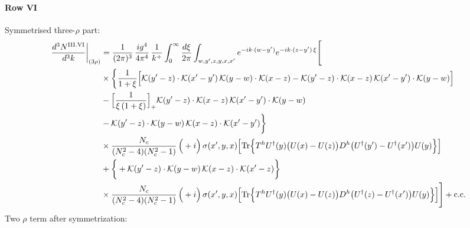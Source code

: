 \documentclass[9pt]{article}
\numberwithin{equation}{section}
\begin{document}
\paragraph*{Row VI}
Symmetrised three-$\rho$ part:
\begin{align}
\frac{d^{3}N^{\rm III.VI}}{d^{3}k}\bigg|_{(3\rho)}&=\frac{1}{(2\pi)^{3}}\,\frac{ig^{4}}{4\pi^{4}}\,\frac{1}{k^{+}}\int_{0}^{\infty}\frac{d\xi}{2\pi}\int_{w,y',z,y,x,x'}e^{-ik\cdot(w-y')}e^{-ik\cdot(z-y')\,\xi}\Bigg[\notag\\
&\times\bigg\{\frac{1}{1+\xi}\Big[\mathcal{K}(y'-z)\cdot\mathcal{K}(x'-y')\,\mathcal{K}(y-w)\cdot\mathcal{K}(x-z)-\mathcal{K}(y'-z)\cdot\mathcal{K}(x-z)\,\mathcal{K}(x'-y')\cdot\mathcal{K}(y-w)\Big]\notag\\
&-\Big[\frac{1}{\xi\,(1+\xi)}\Big]_{+}\mathcal{K}(y'-z)\cdot\mathcal{K}(x-z)\,\mathcal{K}(x'-y')\cdot\mathcal{K}(y-w)\notag\\
&-\mathcal{K}(y'-z)\cdot\mathcal{K}(y-w)\,\mathcal{K}(x-z)\cdot\mathcal{K}(x'-y')\bigg\}\notag\\
&\times \frac{N_{c}}{(N_{c}^{2}-4)(N_{c}^{2}-1)}\,\Big(+i\Big)\,\sigma(x',y,x)\Big[{\rm Tr}\Big\{T^{h}U^{\dagger}(y)\big(U(x)-U(z)\big)D^{h}\big(U^{\dagger}(y')-U^{\dagger}(x')\big)U(y)\Big\}\Big]\notag\\
&+\bigg\{+\mathcal{K}(y'-z)\cdot\mathcal{K}(y-w)\,\mathcal{K}(x-z)\cdot\mathcal{K}(x'-z)\bigg\}\notag\\
&\times \frac{N_{c}}{(N_{c}^{2}-4)(N_{c}^{2}-1)}\,\Big(+i\Big)\,\sigma(x',y,x)\Big[{\rm Tr}\Big\{T^{h}U^{\dagger}(y)\big(U(x)-U(z)\big)D^{h}\big(U^{\dagger}(z)-U^{\dagger}(x')\big)U(y)\Big\}\Big]\Bigg]+{\rm c.c.}\label{eq:S-III.VI-3}
\end{align}
Two $\rho$ term after symmetrization: 
\end{document}
